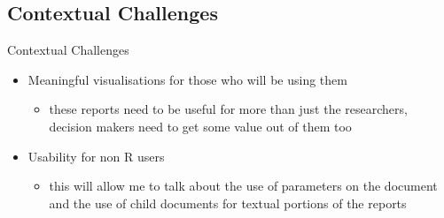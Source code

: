 \documentclass{beamer}
\begin{document}
        \subsection{Contextual Challenges}
            \begin{frame}{Contextual Challenges}
                \begin{itemize}
                    \item Meaningful visualisations for those who will be using them
                    \begin{itemize}
                       \item these reports need to be useful for more than just the researchers, decision makers need to get some value out of them too
                    \end{itemize}
                    \item Usability for non R users
                    \begin{itemize}
                      \item this will allow me to talk about the use of parameters on the document and the use of child documents for textual portions of the reports
                    \end{itemize}
                \end{itemize}
              \end{frame}
\end{document}
